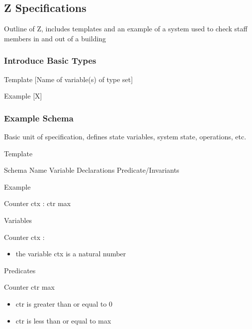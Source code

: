 \documentclass{article}
\begin{document}
\subsection{Z Specifications}
Outline of Z, includes templates and an example of a system used to check staff members in and out of a building
\subsubsection{Introduce Basic Types}
\begin{paragraph}{Template}
  [Name of variable(s) of type set]
\end{paragraph}
\begin{paragraph}{Example}
  [X]
\end{paragraph}
\subsubsection{Example Schema}
Basic unit of specification, defines state variables, system state, operations, etc.
\begin{paragraph}{Template}
\begin{schema}{Schema Name}
  Variable Declarations
  \where
  Predicate/Invariants
\end{schema}
\end{paragraph}
\begin{paragraph}{Example}
  \begin{schema}{Counter}
  ctx : \nat
   \leq ctr \leq max
\end{schema}
\begin{paragraph}{Variables}
  \begin{schema}{Counter}
    ctx : \nat
    \where
\end{schema}
\begin{itemize}
\item the variable ctx is a natural number
\end{itemize}
\end{paragraph}
\begin{paragraph}{Predicates}
  \begin{schema}{Counter}
   \leq ctr \leq max
\end{schema}
  \begin{itemize}
  \item ctr is greater than or equal to 0
  \item ctr is less than or equal to max
  \end{itemize}
\end{paragraph}
\end{paragraph}
\end{document}
